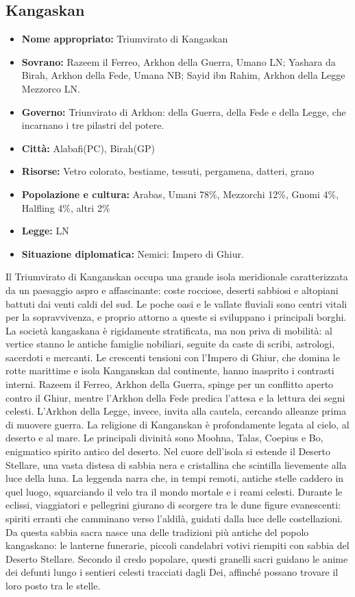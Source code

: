 \documentclass[10pt, a4paper]{report}
\begin{document}
\begin{multicols}{2}
\subsection*{Kangaskan}
\begin{itemize}
	\item \textbf{Nome appropriato:}  Triumvirato di Kangaskan
	\item \textbf{Sovrano:} Razeem il Ferreo, Arkhon della Guerra, Umano LN; Yashara da Birah, Arkhon della Fede, Umana NB; Sayid ibn Rahim, Arkhon della Legge Mezzorco LN.
	\item \textbf{Governo:} Triunvirato di Arkhon: della Guerra, della Fede e della Legge, che incarnano i tre pilastri del potere.
	\item \textbf{Città:} Alabafi(PC), Birah(GP)
	\item \textbf{Risorse:} Vetro colorato, bestiame, tessuti, pergamena, datteri, grano
	\item \textbf{Popolazione e cultura:} Arabas, Umani 78\%, Mezzorchi 12\%, Gnomi 4\%, Halfling 4\%, altri 2\%   
	\item \textbf{Legge:} LN
	\item \textbf{Situazione diplomatica:} Nemici: Impero di Ghiur.
\end{itemize}
Il Triumvirato di Kanganskan occupa una grande isola meridionale caratterizzata da un paesaggio aspro e affascinante: coste rocciose, deserti sabbiosi e altopiani battuti dai venti caldi del sud. Le poche oasi e le vallate fluviali sono centri vitali per la sopravvivenza, e proprio attorno a queste si sviluppano i principali borghi. La società kangaskana è rigidamente stratificata, ma non priva di mobilità: al vertice stanno le antiche famiglie nobiliari, seguite da caste di scribi, astrologi, sacerdoti e mercanti. Le crescenti tensioni con l’Impero di Ghiur, che domina le rotte marittime e isola Kanganskan dal continente, hanno inasprito i contrasti interni. Razeem il Ferreo, Arkhon della Guerra, spinge per un conflitto aperto contro il Ghiur, mentre l’Arkhon della Fede predica l’attesa e la lettura dei segni celesti. L’Arkhon della Legge, invece, invita alla cautela, cercando alleanze prima di muovere guerra.
La religione di Kanganskan è profondamente legata al cielo, al deserto e al mare. Le principali divinità sono Moohna, Talas, Coepius e Bo, enigmatico spirito antico del deserto. Nel cuore dell’isola si estende il Deserto Stellare, una vasta distesa di sabbia nera e cristallina che scintilla lievemente alla luce della luna. La leggenda narra che, in tempi remoti, antiche stelle caddero in quel luogo, squarciando il velo tra il mondo mortale e i reami celesti. Durante le eclissi, viaggiatori e pellegrini giurano di scorgere tra le dune figure evanescenti: spiriti erranti che camminano verso l’aldilà, guidati dalla luce delle costellazioni.
Da questa sabbia sacra nasce una delle tradizioni più antiche del popolo kangaskano: le lanterne funerarie, piccoli candelabri votivi riempiti con sabbia del Deserto Stellare. Secondo il credo popolare, questi granelli sacri guidano le anime dei defunti lungo i sentieri celesti tracciati dagli Dei, affinché possano trovare il loro posto tra le stelle.


\end{multicols}
\end{document}
